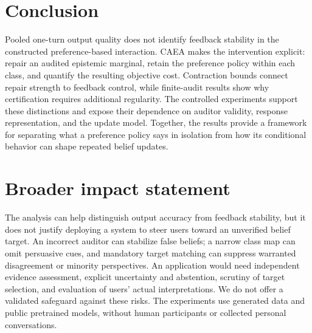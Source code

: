 \documentclass{article}
\begin{document}
\section{Conclusion}
Pooled one-turn output quality does not identify feedback stability in the
constructed preference-based interaction. CAEA makes the intervention
explicit: repair an audited epistemic marginal, retain the preference
policy within each class, and quantify the resulting objective cost.
Contraction bounds connect repair strength to feedback control, while
finite-audit results show why certification requires additional regularity.
The controlled experiments support these distinctions and expose their
dependence on auditor validity, response representation, and the update
model. Together, the results provide a framework for separating what a
preference policy says in isolation from how its conditional behavior can
shape repeated belief updates.

\section*{Broader impact statement}
The analysis can help distinguish output accuracy from feedback stability,
but it does not justify deploying a system to steer users toward an
unverified belief target. An incorrect auditor can stabilize false beliefs;
a narrow class map can omit persuasive cues, and mandatory target matching
can suppress warranted disagreement or minority perspectives. An application
would need independent evidence assessment, explicit uncertainty and
abstention, scrutiny of target selection, and evaluation of users' actual
interpretations. We do not offer a validated safeguard against these risks.
The experiments use generated data and public pretrained models, without
human participants or collected personal conversations.


\clearpage


\end{document}

